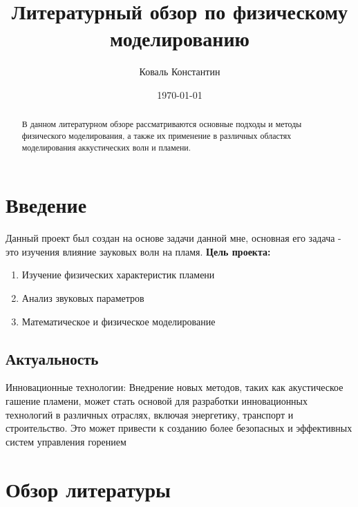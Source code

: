 \documentclass[a4paper,12pt]{article}
\title{Литературный обзор по физическому моделированию}
\author{Коваль Константин}
\date{\today}
\begin{document}
\maketitle

\begin{abstract}
    В данном литературном обзоре рассматриваются основные подходы и методы физического моделирования, а также их применение в различных областях моделирования аккустических волн и пламени.
\end{abstract}

\section{Введение}
Данный проект был создан на основе задачи данной мне, основная его задача - это изучения влияние зауковых волн на пламя.
\newline
\textbf{Цель проекта:}\begin{enumerate}
    \item Изучение физических характеристик пламени
    \item Анализ звуковых параметров
    \item Математическое и физическое моделирование
\end{enumerate}
\subsection{Актуальность}
Инновационные технологии: Внедрение новых методов, таких как акустическое гашение пламени, может стать основой для разработки инновационных технологий в различных отраслях, включая энергетику, транспорт и строительство. Это может привести к созданию более безопасных и эффективных систем управления горением
\newpage
\section{Обзор литературы}
\end{document}

